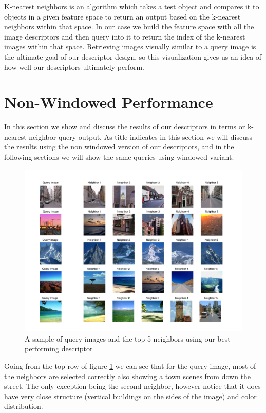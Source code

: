 \documentclass{report}
\begin{document}
K-nearest neighbors is an algorithm which takes a test object and compares it to objects in a given feature space to return an output based on the k-nearest neighbors within that space. In our case we build the feature space with all the image descriptors and then query into it to return the index of the k-nearest images within that space. Retrieving images visually similar to a query image is the ultimate goal of our descriptor design, so this visualization gives us an idea of how well our descriptors ultimately perform.

\section{Non-Windowed Performance}
In this section we show and discuss the results of our descriptors in terms or k-nearest neighbor query output. As title indicates in this section we will discuss the results using the non windowed version of our descriptors, and in the following sections we will show the same queries using windowed variant.
\begin{figure}[H]
        \centering
        \includegraphics[width=\textwidth]{graphics/non_windowed_knearest.pdf}
        \caption{A sample of query images and the top 5 neighbors using our best-performing descriptor}
        \label{fig:non_windowed_knearest}
\end{figure}
Going from the top row of figure \ref{fig:non_windowed_knearest} we can see that for the query image, most of the neighbors are selected correctly also showing a town scenes from down the street. The only exception being the second neighbor, however notice that it does have very close structure (vertical buildings on the sides of the image) and color distribution.
\end{document}
